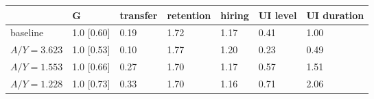 \begin{tabular}{lllllll}
\toprule
 & \textbf{G} & \textbf{transfer} & \textbf{retention} & \textbf{hiring} & \textbf{UI level} & \textbf{UI duration} \\
\midrule
baseline & 1.0 [0.60] & 0.19 & 1.72 & 1.17 & 0.41 & 1.00 \\
$A/Y = 3.623$ & 1.0 [0.53] & 0.10 & 1.77 & 1.20 & 0.23 & 0.49 \\
$A/Y = 1.553$ & 1.0 [0.66] & 0.27 & 1.70 & 1.17 & 0.57 & 1.51 \\
$A/Y = 1.228$ & 1.0 [0.73] & 0.33 & 1.70 & 1.16 & 0.71 & 2.06 \\
\bottomrule
\end{tabular}
